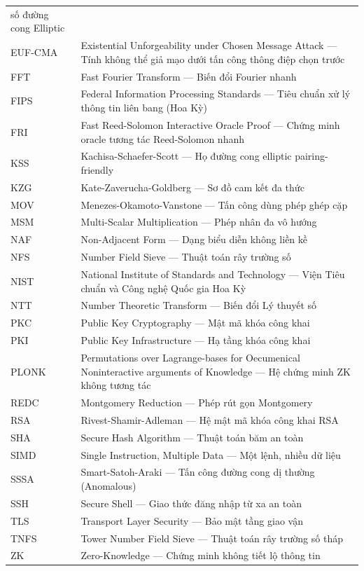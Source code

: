\begin{longtable}[]{@{}
  >{\raggedright\arraybackslash}p{}
  >{\raggedright\arraybackslash}p{}@{}}
số đường cong Elliptic \\
EUF-CMA & Existential Unforgeability under Chosen Message Attack ---
Tính không thể giả mạo dưới tấn công thông điệp chọn trước \\
FFT & Fast Fourier Transform --- Biến đổi Fourier nhanh \\
FIPS & Federal Information Processing Standards --- Tiêu chuẩn xử lý
thông tin liên bang (Hoa Kỳ) \\
FRI & Fast Reed-Solomon Interactive Oracle Proof --- Chứng minh oracle
tương tác Reed-Solomon nhanh \\
KSS & Kachisa-Schaefer-Scott --- Họ đường cong elliptic
pairing-friendly \\
KZG & Kate-Zaverucha-Goldberg --- Sơ đồ cam kết đa thức \\
MOV & Menezes-Okamoto-Vanstone --- Tấn công dùng phép ghép cặp \\
MSM & Multi-Scalar Multiplication --- Phép nhân đa vô hướng \\
NAF & Non-Adjacent Form --- Dạng biểu diễn không liền kề \\
NFS & Number Field Sieve --- Thuật toán rây trường số \\
NIST & National Institute of Standards and Technology --- Viện Tiêu
chuẩn và Công nghệ Quốc gia Hoa Kỳ \\
NTT & Number Theoretic Transform --- Biến đổi Lý thuyết số \\
PKC & Public Key Cryptography --- Mật mã khóa công khai \\
PKI & Public Key Infrastructure --- Hạ tầng khóa công khai \\
PLONK & Permutations over Lagrange-bases for Oecumenical Noninteractive
arguments of Knowledge --- Hệ chứng minh ZK không tương tác \\
REDC & Montgomery Reduction --- Phép rút gọn Montgomery \\
RSA & Rivest-Shamir-Adleman --- Hệ mật mã khóa công khai RSA \\
SHA & Secure Hash Algorithm --- Thuật toán băm an toàn \\
SIMD & Single Instruction, Multiple Data --- Một lệnh, nhiều dữ liệu \\
SSSA & Smart-Satoh-Araki --- Tấn công đường cong dị thường
(Anomalous) \\
SSH & Secure Shell --- Giao thức đăng nhập từ xa an toàn \\
TLS & Transport Layer Security --- Bảo mật tầng giao vận \\
TNFS & Tower Number Field Sieve --- Thuật toán rây trường số tháp \\
ZK & Zero-Knowledge --- Chứng minh không tiết lộ thông tin \\
\end{longtable}

\FloatBarrier
